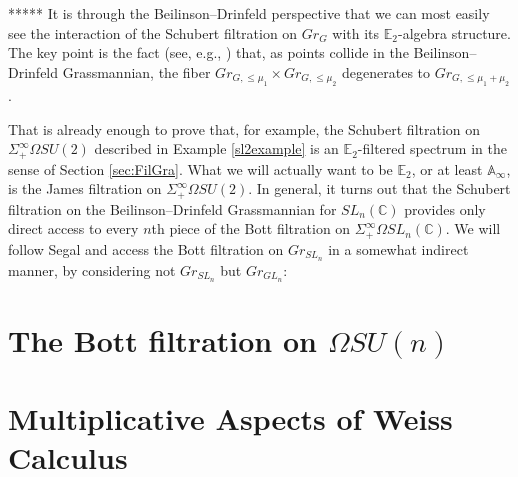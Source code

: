 \documentclass[reqno, oneside]{amsart}
\theoremstyle{definition}
\theoremstyle{plain}
\begin{document}
*****
It is through the Beilinson--Drinfeld perspective that we can most easily see the interaction of the Schubert filtration on $Gr_G$ with its $\mathbb{E}_2$-algebra structure.  The key point is the fact (see, e.g., \cite[3.1.14]{Zhu}) that, as points collide in the Beilinson--Drinfeld Grassmannian, the fiber $Gr_{G,\le \mu_1} \times Gr_{G,\le \mu_2}$ degenerates to $Gr_{G, \le \mu_1+\mu_2}$.

That is already enough to prove that, for example, the Schubert filtration on $\Sigma^{\infty}_+ \Omega SU(2)$ described in Example \ref{sl2example} is an $\mathbb{E}_2$-filtered spectrum in the sense of Section \ref{sec:FilGra}.  What we will actually want to be $\mathbb{E}_2$, or at least $\mathbb{A}_\infty$, is the James filtration on $\Sigma^{\infty}_+ \Omega SU(2)$.  In general, it turns out that the Schubert filtration on the Beilinson--Drinfeld Grassmannian for $SL_n(\mathbb{C})$ provides only direct access to every $n$th piece of the Bott filtration on $\Sigma^{\infty}_+ \Omega SL_n(\mathbb{C})$.  We will follow Segal \cite{Segal} and access the Bott filtration on $Gr_{SL_n}$ in a somewhat indirect manner, by considering not $Gr_{SL_n}$ but $Gr_{GL_n}$:



\section{The Bott filtration on \texorpdfstring{$\Omega SU(n)$}{OmegaSU(n)}} \label{sec:MRFil}

 

\section{Multiplicative Aspects of Weiss Calculus} \label{sec:MultWeiss}


\end{document}
